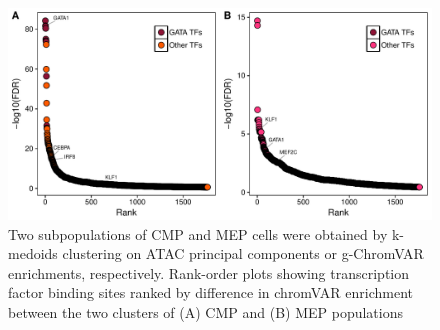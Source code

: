 \documentclass{article}\usepackage[]{graphicx}\usepackage[]{color}
\makeatletter
\def\maxwidth{ %
  \ifdim\Gin@nat@width>\linewidth
    \linewidth
  \else
    \Gin@nat@width
  \fi
}
\newenvironment{knitrout}{}{} %
\makeatother
\begin{document}
\begin{knitrout}
\color{fgcolor}\begin{figure}[H]

{\centering \includegraphics[width=\maxwidth]{figure/tfRankOrderPlots-1} 

}

\caption[Two subpopulations of CMP and MEP cells were obtained by k-medoids clustering on ATAC principal components or g-ChromVAR enrichments, respectively]{Two subpopulations of CMP and MEP cells were obtained by k-medoids clustering on ATAC principal components or g-ChromVAR enrichments, respectively. Rank-order plots showing transcription factor binding sites ranked by difference in chromVAR enrichment between the two clusters of (A) CMP and (B) MEP populations}\label{fig:tfRankOrderPlots}
\end{figure}


\end{knitrout}
\end{document}

